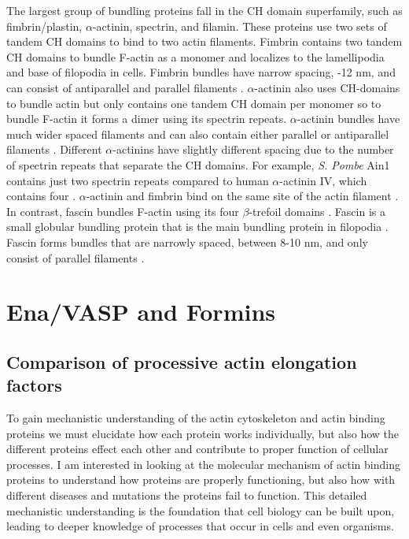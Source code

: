 The largest group of bundling proteins fall in the CH domain superfamily, such as fimbrin/plastin, $\alpha$-actinin, spectrin, and filamin. These proteins use two sets of tandem CH domains to bind to two actin filaments. Fimbrin contains two tandem CH domains to bundle F-actin as a monomer and localizes to the lamellipodia and base of filopodia in cells. Fimbrin bundles have narrow spacing, -12 nm, and can consist of antiparallel and parallel filaments \citep{hanein_atomic_1998}. $\alpha$-actinin also uses CH-domains to bundle actin but only contains one tandem CH domain per monomer so to bundle F-actin it forms a dimer using its spectrin repeats. $\alpha$-actinin bundles have much wider spaced filaments and can also contain either parallel or antiparallel filaments \citep{sjoblom_alpha-actinin_2008}. Different $\alpha$-actinins have slightly different spacing due to the number of spectrin repeats that separate the CH domains. For example, \textit{S. Pombe} Ain1 contains just two spectrin repeats compared to human $\alpha$-actinin IV, which contains four \citep{murphy_actinin_2015}. $\alpha$-actinin and fimbrin bind on the same site of the actin filament \citep{klein_structure_2004}. In contrast, fascin bundles F-actin using its four $\beta$-trefoil domains \citep{jansen_mechanism_2011}. Fascin is a small globular bundling protein that is the main bundling protein in filopodia \citep{vignjevic_role_2006,mellor_role_2010}. Fascin forms bundles that are narrowly spaced, between 8-10 nm, and only consist of parallel filaments \citep{edwards_fascins_1995,jansen_mechanism_2011,cant_drosophila_1994}. 

\section[Ena/VASP and Formins]{Ena/VASP and Formins\footnotemark}\label{ena-formin-review}


\subsection{Comparison of processive actin elongation factors}\label{comparison-why}

To gain mechanistic understanding of the actin cytoskeleton and actin binding proteins we must elucidate how each protein works individually, but also how the different proteins effect each other and contribute to proper function of cellular processes. I am interested in looking at the molecular mechanism of actin binding proteins to understand how proteins are properly functioning, but also how with different diseases and mutations the proteins fail to function. This detailed mechanistic understanding is the foundation that cell biology can be built upon, leading to deeper knowledge of processes that occur in cells and even organisms. 

